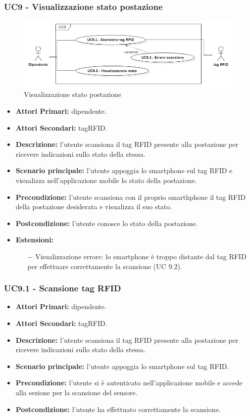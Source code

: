 \subsubsection{ UC9 - Visualizzazione stato postazione}
\begin{figure}[H]
	\centering
	\includegraphics[width=15cm]{res/images/UC9.png}
	\caption{Visualizzazione stato postazione}
	\label{fig:Visualizzazione stato postazione}
\end{figure}
\begin{itemize}
           	\item\textbf{Attori Primari:} dipendente.
           	\item\textbf{Attori Secondari:} tagRFID.
           	\item\textbf{Descrizione:} l’utente scansiona il tag RFID presente alla postazione per ricevere indicazioni sullo stato della stessa.
           	\item\textbf{Scenario principale:} l’utente appoggia lo smartphone sul tag RFID e visualizza nell'applicazione mobile lo stato della postazione.
           	\item\textbf{Precondizione:} l’utente scansiona con il proprio smarthphone il tag RFID della postazione desiderata e visualizza il suo stato.
           	\item\textbf{Postcondizione:} l’utente conosce lo stato della postazione.
           	\item\textbf{Estensioni:}
           	\begin{itemize}
           		\item[$-$]  Visualizzazione errore: lo smartphone è troppo distante dal tag RFID per effettuare correttamente la scansione (UC 9.2).
           	\end{itemize}
\end{itemize}
\subsubsection{ UC9.1 - Scansione tag RFID}
\begin{itemize}
	\item\textbf{Attori Primari:} dipendente.
	\item\textbf{Attori Secondari:} tagRFID.
	\item\textbf{Descrizione:} l’utente scansiona il tag RFID presente alla postazione per ricevere indicazioni sullo stato della stessa.
	\item\textbf{Scenario principale:} l’utente appoggia lo smartphone sul tag RFID.
	\item\textbf{Precondizione:} l’utente si è autenticato nell'applicazione mobile e accede alla sezione per la scansione del sensore.
	\item\textbf{Postcondizione:} l’utente ha effettuato correttamente la scansione.
\end{itemize}
